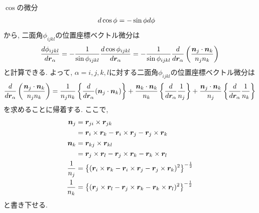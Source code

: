 $\cos$の微分 
\begin{align}
 d \cos\phi &= -\sin\phi d\phi
 \notag
\end{align}
から, 二面角$\phi_{ijkl}$の位置座標ベクトル微分は
\begin{align}
     \frac{d \phi_{ijkl}}{d \bm{r}_{\alpha}}
 = - \frac{1}{\sin\phi_{ijkl}} \frac{d \cos\phi_{ijkl}}{d \bm{r}_{\alpha}}
 = - \frac{1}{\sin\phi_{ijkl}} \frac{d} {d \bm{r}_{\alpha}}
     \left(
           \frac{\bm{n}_{j} \cdot \bm{n}_{k}} {n_{j} n_{k}}
     \right)
 \notag
\end{align}
と計算できる. よって, $\alpha = i, j, k, l$に対する二面角$\phi_{ijkl}$の位置座標ベクトル微分は
\begin{align}
    \frac{d}{d \bm{r}_{\alpha}}
    \left( \frac{\bm{n}_{j} \cdot \bm{n}_{k}} {n_{j} n_{k}} \right)
 =
    \frac{1}{n_{j}n_{k}}
    \left\{
           \frac{d}{d \bm{r}_{\alpha}} (\bm{n}_{j} \cdot \bm{n}_{k})
    \right\}
  +
    \frac{\bm{n}_{k} \cdot \bm{n}_{k}}{n_{k}}
    \left\{
           \frac{d}{d \bm{r}_{\alpha}} \frac{1}{n_{j}}
    \right\}
  +
    \frac{\bm{n}_{j} \cdot \bm{n}_{k}}{n_{j}}
    \left\{
           \frac{d}{d \bm{r}_{\alpha}} \frac{1}{n_{k}}
    \right\}
 \notag
\end{align}
を求めることに帰着する. ここで, 
\begin{alignat}{3}
 \bm{n}_{j} &=  \bm{r}_{ji} \times \bm{r}_{jk}
 \notag \\
                &=  \bm{r}_{i} \times \bm{r}_{k}
                  - \bm{r}_{i} \times \bm{r}_{j}
                  - \bm{r}_{j} \times \bm{r}_{k}
 \notag \\
 \bm{n}_{k} &=  \bm{r}_{kj} \times \bm{r}_{kl}
 \notag \\
                &=  \bm{r}_{j} \times \bm{r}_{l}
                  - \bm{r}_{j} \times \bm{r}_{k}
                  - \bm{r}_{k} \times \bm{r}_{l}
 \notag \\
 \frac{1}{n_{j}} &= \left\{(  \bm{r}_{i} \times \bm{r}_{k}
                            - \bm{r}_{i} \times \bm{r}_{j}
                            - \bm{r}_{j} \times \bm{r}_{k} )^{2}
                    \right\}^{-\frac{1}{2}}
 \notag \\
 \frac{1}{n_{k}} &= \left\{(  \bm{r}_{j} \times \bm{r}_{l}
                            - \bm{r}_{j} \times \bm{r}_{k}
                            - \bm{r}_{k} \times \bm{r}_{l} )^{2}
                    \right\}^{-\frac{1}{2}}
 \notag
\end{alignat}
と書き下せる. 
\\

